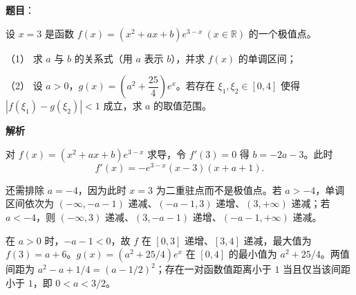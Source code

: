 \begin{answer}

\textbf{题目}：

设 $x=3$ 是函数 $f(x)=(x^2+ax+b)e^{3-x}\ (x\in\mathbb R)$ 的一个极值点。

（1） 求 $a$ 与 $b$ 的关系式（用 $a$ 表示 $b$），并求 $f(x)$ 的单调区间；

（2） 设 $a>0$，$g(x)=\left(a^2+\dfrac{25}{4}\right)e^x$。若存在 $\xi_1,\xi_2\in[0,4]$ 使得 $|f(\xi_1)-g(\xi_2)|<1$ 成立，求 $a$ 的取值范围。

\textbf{解析}


对 $f(x)=(x^2+ax+b)e^{3-x}$ 求导，令 $f'(3)=0$ 得 $b=-2a-3$。此时
\nopagebreak[4]
\[
f'(x)=-e^{3-x}(x-3)(x+a+1).
\]

还需排除 $a=-4$，因为此时 $x=3$ 为二重驻点而不是极值点。若 $a>-4$，单调区间依次为 $(-\infty,-a-1)$ 递减、$(-a-1,3)$ 递增、$(3,+\infty)$ 递减；若 $a<-4$，则 $(-\infty,3)$ 递减、$(3,-a-1)$ 递增、$(-a-1,+\infty)$ 递减。


在 $a>0$ 时，$-a-1<0$，故 $f$ 在 $[0,3]$ 递增、$[3,4]$ 递减，最大值为 $f(3)=a+6$。$g(x)=(a^2+25/4)e^x$ 在 $[0,4]$ 的最小值为 $a^2+25/4$。两值间距为 $a^2-a+1/4=(a-1/2)^2$；存在一对函数值距离小于 $1$ 当且仅当该间距小于 $1$，即 $0<a<3/2$。



\end{answer}